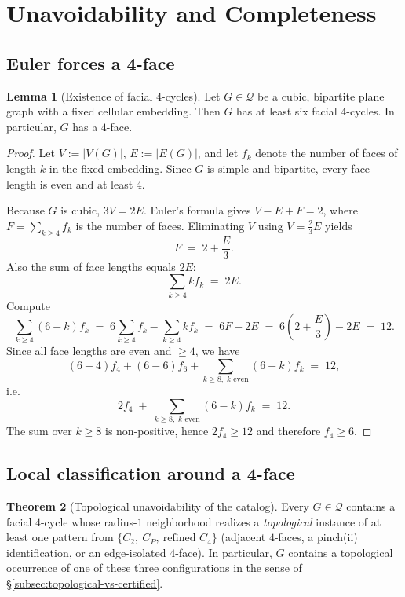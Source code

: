 \documentclass[12pt]{article}
\theoremstyle{definition}
\newtheorem{theorem}{Theorem}
\newtheorem{lemma}[theorem]{Lemma}
\begin{document}
\section{Unavoidability and Completeness}
\label{sec:unavoidability}

\subsection{Euler forces a 4-face}
\label{subsec:euler-forces-4face}

\begin{lemma}[Existence of facial $4$-cycles]
\label{lem:existence-f4}
Let $G\in\mathcal Q$ be a cubic, bipartite plane graph with a fixed cellular embedding.
Then $G$ has at least six facial $4$-cycles. In particular, $G$ has a $4$-face.
\end{lemma}

\begin{proof}
Let $V:=|V(G)|$, $E:=|E(G)|$, and let $f_k$ denote the number of faces of length $k$
in the fixed embedding. Since $G$ is simple and bipartite, every face length is even and at least $4$.

Because $G$ is cubic, $3V=2E$.
Euler's formula gives $V-E+F=2$, where $F=\sum_{k\ge 4} f_k$ is the number of faces.
Eliminating $V$ using $V=\frac{2}{3}E$ yields
\[
F \;=\; 2 + \frac{E}{3}.
\]
Also the sum of face lengths equals $2E$:
\[
\sum_{k\ge 4} k f_k \;=\; 2E.
\]
Compute
\[
\sum_{k\ge 4} (6-k) f_k
\;=\;
6\sum_{k\ge 4} f_k - \sum_{k\ge 4} k f_k
\;=\;
6F - 2E
\;=\;
6\left(2+\frac{E}{3}\right) - 2E
\;=\; 12.
\]
Since all face lengths are even and $\ge 4$, we have
\[
(6-4)f_4 + (6-6)f_6 + \sum_{k\ge 8,\; k\text{ even}} (6-k)f_k \;=\; 12,
\]
i.e.
\[
2f_4 \;+\; \sum_{k\ge 8,\; k\text{ even}} (6-k)f_k \;=\; 12.
\]
The sum over $k\ge 8$ is non-positive, hence
$2f_4\ge 12$ and therefore $f_4\ge 6$.
\end{proof}

\subsection{Local classification around a 4-face}
\label{subsec:local-classification-4face}

\begin{theorem}[Topological unavoidability of the catalog]
\label{thm:completeness}
Every $G\in\mathcal Q$ contains a facial $4$-cycle whose radius-$1$ neighborhood realizes a \emph{topological} instance of at least one pattern from
$\{C_2,\ C_P,\ \text{refined }C_4\}$ (adjacent $4$-faces, a pinch(ii) identification, or an edge-isolated $4$-face).
In particular, $G$ contains a topological occurrence of one of these three configurations in the sense of \S\ref{subsec:topological-vs-certified}.
\end{theorem}
\end{document}
